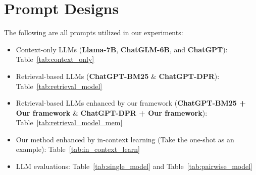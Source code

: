 \documentclass[authoryear,preprint,review,12pt]{elsarticle}
\begin{document}
\section{Prompt Designs}
\label{ap:prompt}
The following are all prompts utilized in our experiments:
\begin{itemize}
    \item Context-only LLMs (\textbf{Llama-7B}, \textbf{ChatGLM-6B}, and \textbf{ChatGPT}): Table~\ref{tab:context_only}
    \item Retrieval-based LLMs (\textbf{ChatGPT-BM25} \& \textbf{ChatGPT-DPR}): Table~\ref{tab:retrieval_model}
    \item Retrieval-based LLMs enhanced by our framework (\textbf{ChatGPT-BM25 + Our framework} \& \textbf{ChatGPT-DPR + Our framework}): Table~\ref{tab:retrieval_model_mem}
    \item Our method enhanced by in-context learning (Take the one-shot as an example): Table~\ref{tab:in_context_learn}
    \item LLM evaluations: Table~\ref{tab:single_model} and Table~\ref{tab:pairwise_model}
\end{itemize}

\begin{table}[htbp]
\centering
\caption{The prompt for the context-only LLM.}
\label{tab:context_only}
\end{table}
\end{document}
